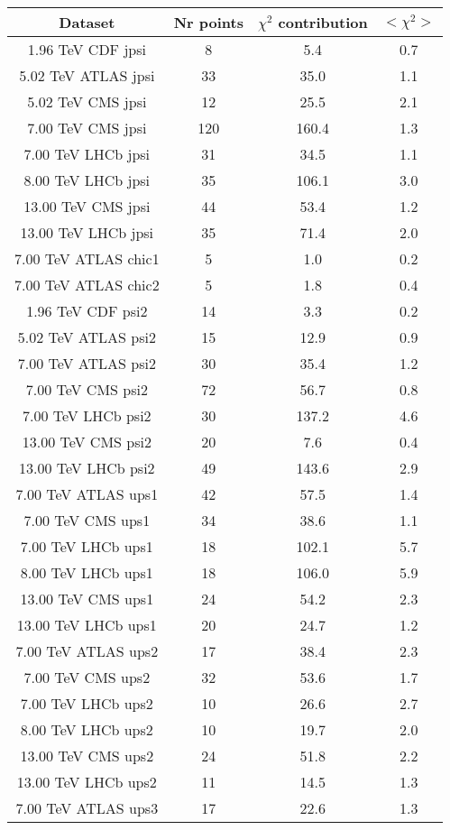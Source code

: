 \begin{table}[h!]
\centering
\begin{tabular}{c|c|c|c}
Dataset & Nr points & $\chi^2$ contribution & $<\chi^2>$ \\
\hline
1.96 TeV CDF jpsi & 8 & 5.4 & 0.7 \\
5.02 TeV ATLAS jpsi & 33 & 35.0 & 1.1 \\
5.02 TeV CMS jpsi & 12 & 25.5 & 2.1 \\
7.00 TeV CMS jpsi & 120 & 160.4 & 1.3 \\
7.00 TeV LHCb jpsi & 31 & 34.5 & 1.1 \\
8.00 TeV LHCb jpsi & 35 & 106.1 & 3.0 \\
13.00 TeV CMS jpsi & 44 & 53.4 & 1.2 \\
13.00 TeV LHCb jpsi & 35 & 71.4 & 2.0 \\
7.00 TeV ATLAS chic1 & 5 & 1.0 & 0.2 \\
7.00 TeV ATLAS chic2 & 5 & 1.8 & 0.4 \\
1.96 TeV CDF psi2 & 14 & 3.3 & 0.2 \\
5.02 TeV ATLAS psi2 & 15 & 12.9 & 0.9 \\
7.00 TeV ATLAS psi2 & 30 & 35.4 & 1.2 \\
7.00 TeV CMS psi2 & 72 & 56.7 & 0.8 \\
7.00 TeV LHCb psi2 & 30 & 137.2 & 4.6 \\
13.00 TeV CMS psi2 & 20 & 7.6 & 0.4 \\
13.00 TeV LHCb psi2 & 49 & 143.6 & 2.9 \\
7.00 TeV ATLAS ups1 & 42 & 57.5 & 1.4 \\
7.00 TeV CMS ups1 & 34 & 38.6 & 1.1 \\
7.00 TeV LHCb ups1 & 18 & 102.1 & 5.7 \\
8.00 TeV LHCb ups1 & 18 & 106.0 & 5.9 \\
13.00 TeV CMS ups1 & 24 & 54.2 & 2.3 \\
13.00 TeV LHCb ups1 & 20 & 24.7 & 1.2 \\
7.00 TeV ATLAS ups2 & 17 & 38.4 & 2.3 \\
7.00 TeV CMS ups2 & 32 & 53.6 & 1.7 \\
7.00 TeV LHCb ups2 & 10 & 26.6 & 2.7 \\
8.00 TeV LHCb ups2 & 10 & 19.7 & 2.0 \\
13.00 TeV CMS ups2 & 24 & 51.8 & 2.2 \\
13.00 TeV LHCb ups2 & 11 & 14.5 & 1.3 \\
7.00 TeV ATLAS ups3 & 17 & 22.6 & 1.3 \\

\end{tabular}
\end{table}
